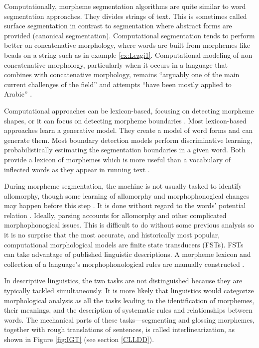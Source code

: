 \documentclass[12pt]{article}
\begin{document}
Computationally, morpheme segmentation algorithms are quite similar to word segmentation approaches. They divides strings of text. This is sometimes called surface segmentation in contrast to segmentation where abstract forms are provided (canonical segmentation). Computational segmentation tends to perform better on concatenative morphology, where words are built from morphemes like beads on a string such as in example \ref{ex:Lezgi1}. Computational modeling of non-concatenative morphology, particularly when it occurs in a language that combines with concatenative morphology, remains ``arguably one of the main current challenges of the field'' and attempts ``have been mostly applied to Arabic'' \cite{goldsmith_computational_2017}.

Computational approaches can be lexicon-based, focusing on detecting morpheme shapes, or it can focus on detecting morpheme boundaries \cite{goodman_generation_2013}. Most lexicon-based approaches learn a generative model. They create a model of word forms and can generate them. Most boundary detection models perform discriminative learning, probabilistically estimating the segmentation boundaries in a given word. Both provide a lexicon of morphemes which is more useful than a vocabulary of inflected words as they appear in running text \cite{creutz_unsupervised_2002}.  

During morpheme segmentation, the machine is not usually tasked to identify allomorphy, though some learning of allomorphy and morphophonogical changes may happen before this step \cite{goldsmith_computational_2017}. It is done without regard to the words' potential relation \cite{virpioja_empirical_2011}. Ideally, parsing accounts for allomorphy and other complicated morphophonogical issues. This is difficult to do without some previous analysis so it is no surprise that the most accurate, and historically most popular, computational morphological models are finite state transducers (FSTs). FSTs can take advantage of published linguistic descriptions. A morpheme lexicon and collection of a language's morphophonological rules are manually constructed \cite{beesley_finite-state_2003}. 

In descriptive linguistics, the two tasks are not distinguished because they are typically tackled simultaneously. It is more likely that linguistics would categorize morphological analysis as all the tasks leading to the identification of morphemes, their meanings, and the description of systematic rules and relationships between words. The mechanical parts of these tasks---segmenting and glossing morphemes, together with rough translations of sentences, is called interlinearization, as shown in Figure \ref{fig:IGT} (see section \ref{CLLDD}).
\end{document}
